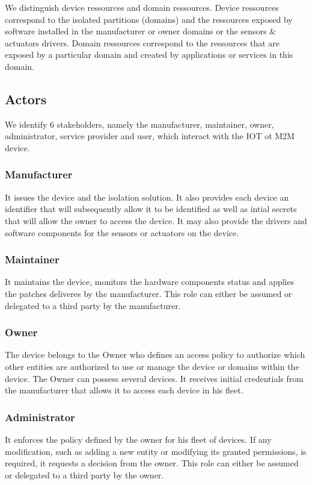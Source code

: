 \documentclass[conference]{IEEEtran}
\begin{document}
We distinguish device ressources and domain ressources. Device ressources correspond to the isolated partitions (domains) and the ressources exposed by software installed in the manufacturer or owner domains or the sensors \& actuators drivers. Domain ressources correspond to the ressources that are exposed by a particular domain and created by applications or services in this domain.\\

\subsection{Actors}
\label{sec:Actors}
We identify 6 stakeholders, namely the manufacturer, maintainer, owner, administrator, service provider and user, which interact with the IOT ot M2M device.
\subsubsection{Manufacturer}
It issues the device and the isolation solution. It also provides each device an identifier that will subsequently allow it to be identified as well as intial secrets that will allow the owner to access the device. It may also provide the drivers and software components for the sensors or actuators on the device. 
\subsubsection{Maintainer}
It maintains the device, monitors the hardware components status and applies the patches deliveres by the manufacturer. This role can either be assumed or delegated to a third party by the manufacturer. 
\subsubsection{Owner}
The device belongs to the Owner who defines an access policy to authorize which other entities are authorized to use or manage the device or domains within the device. The Owner can possess several devices. It receives initial credentials from the manufacturer that allows it to access each device in his fleet. 
\subsubsection{Administrator}
It enforces the policy defined by the owner for his fleet of devices. If any modification, such as adding a new entity or modifying its granted permissions,  is required, it requests a decision from the owner. This role can either be assumed or delegated to a third party by the owner. 
\end{document}
